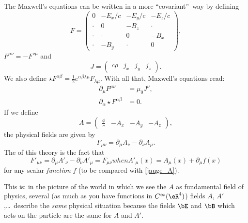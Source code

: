 The Maxwell's equations can be written in a more ``covariant''\ way by defining
\begin{equation}\label{def_F}
F=\begin{pmatrix}
0 & -E_x/c & -E_y/c & -E_z/c \\
\cdot & 0 & -B_z & \cdot \\
\cdot & \cdot & 0 & -B_x \\
\cdot & -B_y & \cdot & 0
\end{pmatrix},
\end{equation} $F^{\mu\nu}=-F^{\nu\mu}$ and
\[
 J=\begin{pmatrix}
c\rho & j_x & j_y & j_z
\end{pmatrix}.
\]
We also define $\star F^{\alpha\beta}=\frac{1}{2} e^{\alpha\beta\lambda\mu}F_{\lambda\mu}$. With all that, Maxwell's equations read:
\begin{equation}
\begin{split}
\partial_{\mu} F^{\mu\nu}&=\mu_0J^{\nu},\\
\partial_{\alpha}\star F^{\alpha\beta}&=0.
\end{split}
\end{equation}
If we define
\begin{equation}\label{def_A}
  A=\begin{pmatrix}
\frac{\displaystyle\phi}{\displaystyle c} & -A_x & -A_y & -A_z
\end{pmatrix},
\end{equation}
%
the physical fields are given by
\[
  F_{\mu\nu}=\partial_{\mu}A_{\nu}-\partial_{\nu}A_{\mu}.
\]
The  of this theory is the fact that
\begin{subequations}
\begin{equation}
  F'_{\mu\nu}=\partial_{\mu}A'_{\nu}-\partial_{\nu}A'_{\mu}=F_{\mu\nu}
\end{equation}
when
\begin{equation}
A'_{\mu}(x)=A_{\mu}(x)+\partial_{\mu}f(x)
\end{equation}
\end{subequations}
for any scalar \emph{function} $f$ (to be compared with \eqref{jauge_A}).

This is: in the picture of the world in which we see the $A$ as fundamental field of physics, several (as much as you have functions in $C^{\infty}(\eR^4)$) fields $A$, $A'$,\ldots\ describe the \emph{same} physical situation because the fields $\bE$ and $\bB$ which acts on the particle are the same for $A$ and $A'$.

